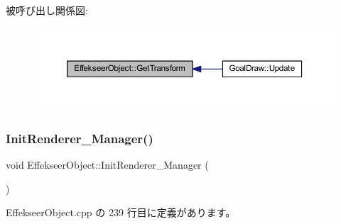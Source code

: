被呼び出し関係図\+:\nopagebreak
\begin{figure}[H]
\begin{center}
\leavevmode
\includegraphics[width=350pt]{class_effekseer_object_ad7e825d08856df48459437ad759d7a00_icgraph}
\end{center}
\end{figure}
\mbox{\label{class_effekseer_object_a4f8e7ad6b6ebfa341302f6b78e846f1e}} 
\subsubsection{\texorpdfstring{Init\+Renderer\+\_\+\+Manager()}{InitRenderer\_Manager()}}
{\footnotesize\ttfamily void Effekseer\+Object\+::\+Init\+Renderer\+\_\+\+Manager (\begin{DoxyParamCaption}{ }\end{DoxyParamCaption})\hspace{0.3cm}{\ttfamily [private]}}



 Effekseer\+Object.\+cpp の 239 行目に定義があります。

